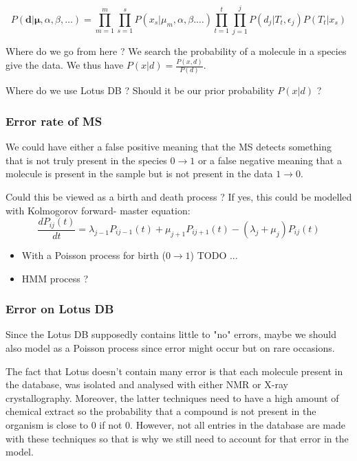 \documentclass[a4paper,10pt]{article}
\def\d{\boldsymbol{d}}
\begin{document}
\begin{equation}
	P(\d | \boldsymbol{\mu}, \alpha, \beta, \ldots) = \prod_{m=1}^{m}\prod_{s=1}^{s}P(x_s|\mu_m, \alpha, \beta. \ldots) \prod_{t=1}^{t}\prod_{j=1}^{j}P(d_j | T_t, \epsilon_j)P(T_t | x_s)
\end{equation}

Where do we go from here ? We search the probability of a molecule in a species give the data. We thus have $P(x|d) = \frac{P(x, d)}{P(d)}$. 

Where do we use Lotus DB ? Should it be our prior probability $P(x|d)$ ? 

\subsubsection{Error rate of MS}
We could have either a false positive meaning that the MS detects something that is not truly present in the species $0\rightarrow 1$ or a false negative meaning that a molecule is present in the sample but is not present in the data $1 \rightarrow 0$. 

Could this be viewed as a birth and death process ? If yes, this could be modelled with Kolmogorov forward- master equation: 
\begin{equation}
	\frac{dP_{ij}(t)}{dt} = \lambda_{j-1}P_{ij-1}(t) + \mu_{j+1}P_{ij+1}(t) - (\lambda_j + \mu_j)P_{ij}(t)
\end{equation}

\begin{itemize}
	\item With a Poisson process for birth ($0\rightarrow 1$) TODO ...
	\item HMM process ? 
\end{itemize}



\subsubsection{Error on Lotus DB}
Since the Lotus DB supposedly contains little to "no" errors, maybe we should also model as a Poisson process since error might occur but on rare occasions. 

The fact that Lotus doesn't contain many error is that each molecule present in the database, was isolated and analysed with either NMR or X-ray crystallography. Moreover, the latter techniques need to have a high amount of chemical extract so the probability that a compound is not present in the organism is close to 0 if not 0. However, not all entries in the database are made with these techniques so that is why we still need to account for that error in the model. 
\end{document}
